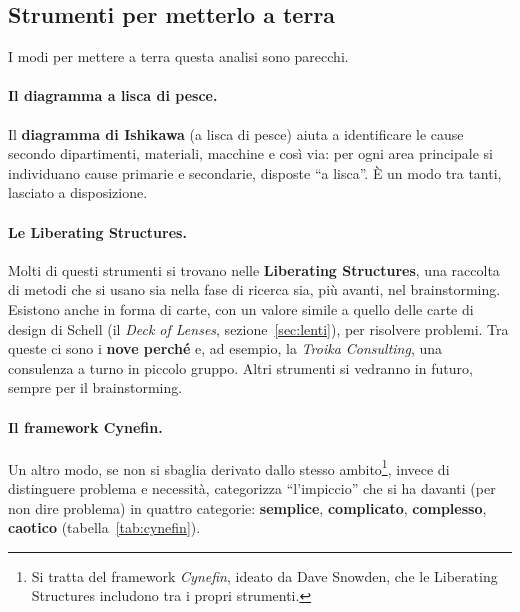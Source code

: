 \subsection{Strumenti per metterlo a terra}

I modi per mettere a terra questa analisi sono parecchi.

\paragraph{Il diagramma a lisca di pesce.} Il \textbf{diagramma di
Ishikawa} (a lisca di pesce) aiuta a identificare le cause secondo
dipartimenti, materiali, macchine e così via: per ogni area principale si
individuano cause primarie e secondarie, disposte ``a lisca''. È un modo tra
tanti, lasciato a disposizione.

\paragraph{Le Liberating Structures.} Molti di questi strumenti si trovano
nelle \textbf{Liberating Structures}, una raccolta di metodi che si usano sia
nella fase di ricerca sia, più avanti, nel brainstorming. Esistono anche in
forma di carte, con un valore simile a quello delle carte di design di Schell
(il \emph{Deck of Lenses}, sezione~\ref{sec:lenti}), per risolvere problemi.
Tra queste ci sono i \textbf{nove perché} e, ad esempio, la \emph{Troika
Consulting}, una consulenza a turno in piccolo gruppo. Altri strumenti si
vedranno in futuro, sempre per il brainstorming.

\paragraph{Il framework Cynefin.} Un altro modo, se non si sbaglia derivato
dallo stesso ambito\footnote{Si tratta del framework \emph{Cynefin}, ideato
da Dave Snowden, che le Liberating Structures includono tra i propri
strumenti.}, invece di distinguere problema e necessità, categorizza
``l'impiccio'' che si ha davanti (per non dire problema) in quattro categorie:
\textbf{semplice}, \textbf{complicato}, \textbf{complesso},
\textbf{caotico} (tabella~\ref{tab:cynefin}).

